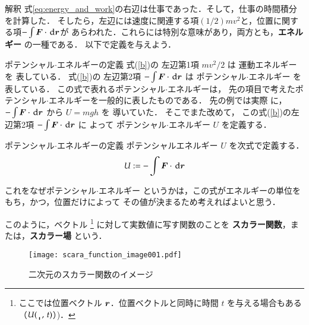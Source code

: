             \begin{mysmallsec}{解釈}
                式\eqref{eq:energy_and_work}の右辺は仕事であった．そして，仕事の時間積分を計算した．
                そしたら，左辺には速度に関連する項$(1/2)m{v}^{2}$と，位置に関する項$-\int \boldsymbol{F}\cdot \,\mathrm{d}\boldsymbol{r}$が
                あらわれた．これらには特別な意味があり，両方とも，\textbf{エネルギー} の一種である．
                以下で定義を与えよう．
            \end{mysmallsec}

            \begin{mysmallsec}{ポテンシャル$\cdot$エネルギーの定義}
                式(\ref{b})の
                左辺第1項 $mv^{2}/2$ は 運動エネルギー を
                表している．
                式(\ref{b})の
                左辺第2項 $-\int \boldsymbol{F}\cdot \,\mathrm{d}\boldsymbol{r}$ は ポテンシャル$\cdot$エネルギー を
                表している．
                この式で表れるポテンシャル$\cdot$エネルギーは，
                先の項目で考えたポテンシャル$\cdot$エネルギーを一般的に表したものである．
                先の例では実際
                に，$-\int \boldsymbol{F}\cdot \,\mathrm{d}\boldsymbol{r}$ から $U=mgh$ を
                導いていた．
                そこでまた改めて，
                この式(\ref{b})の左辺第2項 $-\int \boldsymbol{F}\cdot \,\mathrm{d}\boldsymbol{r}$ に
                よって ポテンシャル$\cdot$エネルギー $U$ を定義する．
                    \begin{myshadebox}{ポテンシャル$\cdot$エネルギーの定義}
                        ポテンシャルエネルギー $U$ を次式で定義する．
                        \begin{align}\label{eq:PE}
                            U:= -\int \bF\cdot \df \br
                        \end{align}
                    \end{myshadebox}

                これをなぜポテンシャル$\cdot$エネルギー
                というかは，この式がエネルギーの単位をもち，かつ，位置だけによって
                その値が決まるため考えればよいと思う．

                このように，ベクトル
                        \footnote{
                        ここでは位置ベクトル $\boldsymbol{r}$．位置ベクトルと同時に時間 $t$ を与える場合もある（$U(\bracevert,\,t)$）)．
                        }
                に対して実数値に写す関数のことを \textbf{スカラー関数}，または，\textbf{スカラー場} という．
                    \begin{figure}[hbt]
                        \begin{center}
                            \texttt{[image: scara\_function\_image001.pdf]}
                            \caption{二次元のスカラー関数のイメージ}
                            \label{fig:scara_function_image001}
                        \end{center}
                    \end{figure}



\end{mysmallsec}
